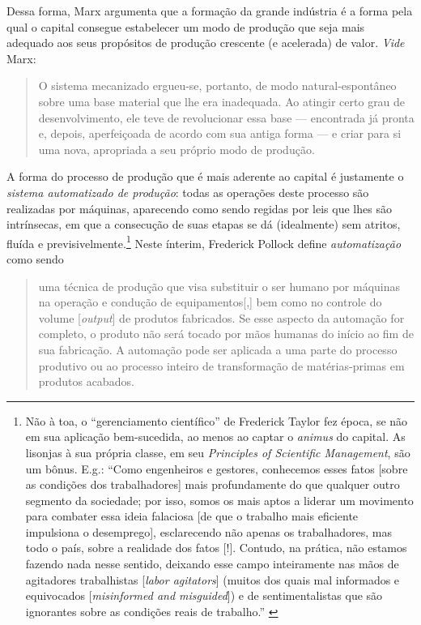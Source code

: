 Dessa forma, Marx argumenta que a formação da grande indústria é a forma pela qual o capital consegue estabelecer um modo de produção que seja mais adequado aos seus propósitos de produção crescente (e acelerada) de valor. \textit{Vide} Marx:
\begin{quote}
    O sistema mecanizado ergueu-se, portanto, de modo natural-espontâneo sobre uma base material que lhe era inadequada. Ao atingir certo grau de desenvolvimento, ele teve de revolucionar essa base --- encontrada já pronta e, depois, aperfeiçoada de acordo com sua antiga forma --- e criar para si uma nova, apropriada a seu próprio modo de produção. \parencite[p. 456]{Marx2017}
\end{quote}

A forma do processo de produção que é mais aderente ao capital é justamente o \textit{sistema automatizado de produção}: todas as operações deste processo são realizadas por máquinas, aparecendo como sendo regidas por leis que lhes são intrínsecas, em que a consecução de suas etapas se dá (idealmente) sem atritos, fluída e previsivelmente.\footnote{Não à toa, o ``gerenciamento científico'' de Frederick Taylor fez época, se não em sua aplicação bem-sucedida, ao menos ao captar o \textit{animus} do capital. As lisonjas à sua própria classe, em seu \textit{Principles of Scientific Management}, são um bônus. E.g.: ``Como engenheiros e gestores, conhecemos esses fatos [sobre as condições dos trabalhadores] mais profundamente do que qualquer outro segmento da sociedade; por isso, somos os mais aptos a liderar um movimento para combater essa ideia falaciosa [de que o trabalho mais eficiente impulsiona o desemprego], esclarecendo não apenas os trabalhadores, mas todo o país, sobre a realidade dos fatos [!]. Contudo, na prática, não estamos fazendo nada nesse sentido, deixando esse campo inteiramente nas mãos de agitadores trabalhistas [\textit{labor agitators}] (muitos dos quais mal informados e equivocados [\textit{misinformed and misguided}]) e de sentimentalistas que são ignorantes sobre as condições reais de trabalho.'' \parencite[p. 18]{Taylor1911}} Neste ínterim, Frederick Pollock define \textit{automatização} como sendo
\begin{quote}
    uma técnica de produção que visa substituir o ser humano por máquinas na operação e condução de equipamentos[,] bem como no controle do volume [\textit{output}] de produtos fabricados. Se esse aspecto da automação for completo, o produto não será tocado por mãos humanas do início ao fim de sua fabricação. A automação pode ser aplicada a uma parte do processo produtivo ou ao processo inteiro de transformação de matérias-primas em produtos acabados. \parencite[p. 5]{Pollock1957}
\end{quote}

